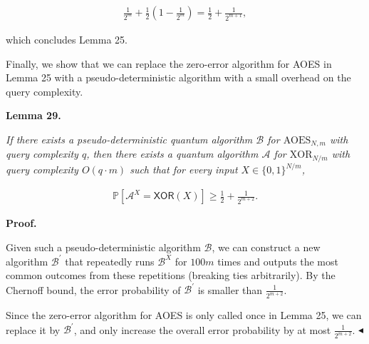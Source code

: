 \[\begin{gathered}
\frac{1}{2^{m}}+\frac{1}{2}(1-\frac{1}{2^{m}})=\frac{1}{2}+\frac{1}{2^{m+1}},
\end{gathered}\]


which concludes Lemma 25.\par




Finally, we show that we can replace the zero-error algorithm for AOES in Lemma 25 with a pseudo-deterministic algorithm with a small overhead on the query complexity.\par





\par\medskip\noindent\textbf{
\textbf{Lemma 29}\textbf{.}
}\par



\emph{If there exists a pseudo-deterministic quantum algorithm $\mathcal{B}$ for ${\text{AOES}}_{N,m}$ with query complexity $q$, then there exists a quantum algorithm $\mathcal{A}$ for ${\text{XOR}}_{N/m}$ with query complexity $O(q\cdot m)$ such that for every input $X\in\{0,1\}^{N/m}$,}\par


\[\begin{gathered}
\mathbb{P}\left[\mathcal{A}^{X}=\mathsf{XOR}(X)\right]\geq\frac{1}{2}+\frac{1}{2^{m+2}}.
\end{gathered}\]







\par\medskip\noindent\textbf{Proof.}\par




Given such a pseudo-deterministic algorithm $\mathcal{B}$, we can construct a new algorithm $\mathcal{B}^{\prime}$ that repeatedly runs $\mathcal{B}^{X}$ for $100m$ times and outputs the most common outcomes from these repetitions (breaking ties arbitrarily).
By the Chernoff bound, the error probability of $\mathcal{B}^{\prime}$ is smaller than $\frac{1}{2^{m+2}}$.\par




Since the zero-error algorithm for AOES is only called once in Lemma 25, we can replace it by $\mathcal{B^{\prime}}$, and only increase the overall error probability by at most $\frac{1}{2^{m+2}}$.
$\blacktriangleleft$\par




